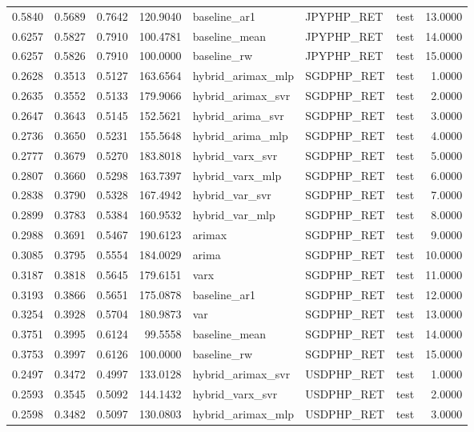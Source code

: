 \begin{tabular}{rrrrlllr}
0.5840 & 0.5689 & 0.7642 & 120.9040 & baseline_ar1 & JPYPHP_RET & test & 13.0000 \\
0.6257 & 0.5827 & 0.7910 & 100.4781 & baseline_mean & JPYPHP_RET & test & 14.0000 \\
0.6257 & 0.5826 & 0.7910 & 100.0000 & baseline_rw & JPYPHP_RET & test & 15.0000 \\
0.2628 & 0.3513 & 0.5127 & 163.6564 & hybrid_arimax_mlp & SGDPHP_RET & test & 1.0000 \\
0.2635 & 0.3552 & 0.5133 & 179.9066 & hybrid_arimax_svr & SGDPHP_RET & test & 2.0000 \\
0.2647 & 0.3643 & 0.5145 & 152.5621 & hybrid_arima_svr & SGDPHP_RET & test & 3.0000 \\
0.2736 & 0.3650 & 0.5231 & 155.5648 & hybrid_arima_mlp & SGDPHP_RET & test & 4.0000 \\
0.2777 & 0.3679 & 0.5270 & 183.8018 & hybrid_varx_svr & SGDPHP_RET & test & 5.0000 \\
0.2807 & 0.3660 & 0.5298 & 163.7397 & hybrid_varx_mlp & SGDPHP_RET & test & 6.0000 \\
0.2838 & 0.3790 & 0.5328 & 167.4942 & hybrid_var_svr & SGDPHP_RET & test & 7.0000 \\
0.2899 & 0.3783 & 0.5384 & 160.9532 & hybrid_var_mlp & SGDPHP_RET & test & 8.0000 \\
0.2988 & 0.3691 & 0.5467 & 190.6123 & arimax & SGDPHP_RET & test & 9.0000 \\
0.3085 & 0.3795 & 0.5554 & 184.0029 & arima & SGDPHP_RET & test & 10.0000 \\
0.3187 & 0.3818 & 0.5645 & 179.6151 & varx & SGDPHP_RET & test & 11.0000 \\
0.3193 & 0.3866 & 0.5651 & 175.0878 & baseline_ar1 & SGDPHP_RET & test & 12.0000 \\
0.3254 & 0.3928 & 0.5704 & 180.9873 & var & SGDPHP_RET & test & 13.0000 \\
0.3751 & 0.3995 & 0.6124 & 99.5558 & baseline_mean & SGDPHP_RET & test & 14.0000 \\
0.3753 & 0.3997 & 0.6126 & 100.0000 & baseline_rw & SGDPHP_RET & test & 15.0000 \\
0.2497 & 0.3472 & 0.4997 & 133.0128 & hybrid_arimax_svr & USDPHP_RET & test & 1.0000 \\
0.2593 & 0.3545 & 0.5092 & 144.1432 & hybrid_varx_svr & USDPHP_RET & test & 2.0000 \\
0.2598 & 0.3482 & 0.5097 & 130.0803 & hybrid_arimax_mlp & USDPHP_RET & test & 3.0000 \\

\end{tabular}
